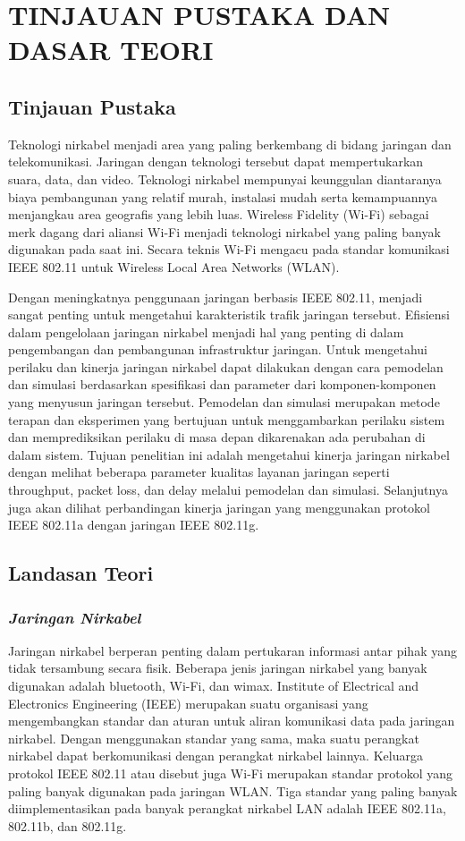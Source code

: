 \documentclass{jtetiproposalskripsi}
\begin{document}
\chapter{TINJAUAN PUSTAKA DAN DASAR TEORI}                

\section{Tinjauan Pustaka}
Teknologi nirkabel menjadi area yang paling berkembang di bidang jaringan dan telekomunikasi. Jaringan dengan teknologi tersebut dapat mempertukarkan suara, data, dan video. Teknologi nirkabel mempunyai keunggulan diantaranya biaya pembangunan yang relatif murah, instalasi mudah serta kemampuannya menjangkau area geografis yang lebih luas. 
Wireless Fidelity (Wi-Fi) sebagai merk dagang dari aliansi Wi-Fi menjadi teknologi nirkabel yang paling banyak digunakan pada saat ini. Secara teknis Wi-Fi mengacu pada standar komunikasi IEEE 802.11 untuk Wireless Local Area Networks (WLAN). 

Dengan meningkatnya penggunaan jaringan berbasis IEEE 802.11, menjadi sangat penting untuk mengetahui karakteristik trafik jaringan tersebut. Efisiensi dalam pengelolaan jaringan nirkabel menjadi hal yang penting di dalam pengembangan dan pembangunan infrastruktur jaringan. Untuk mengetahui perilaku dan kinerja jaringan nirkabel dapat dilakukan dengan cara pemodelan dan simulasi berdasarkan spesifikasi dan parameter dari komponen-komponen yang menyusun jaringan tersebut. Pemodelan dan simulasi merupakan metode terapan dan eksperimen yang bertujuan untuk menggambarkan perilaku sistem dan memprediksikan perilaku di masa depan dikarenakan ada perubahan di dalam sistem. Tujuan penelitian ini adalah mengetahui kinerja jaringan nirkabel dengan melihat beberapa parameter kualitas layanan jaringan seperti throughput, packet loss, dan delay melalui pemodelan dan simulasi. Selanjutnya juga akan dilihat perbandingan kinerja jaringan yang menggunakan protokol IEEE 802.11a dengan jaringan IEEE 802.11g.

\section{Landasan Teori}
\subsection{\emph{Jaringan Nirkabel}}
Jaringan nirkabel berperan penting dalam pertukaran informasi antar pihak yang tidak tersambung secara fisik. Beberapa jenis jaringan nirkabel yang banyak digunakan adalah bluetooth, Wi-Fi, dan wimax. Institute of Electrical and Electronics Engineering (IEEE) merupakan suatu organisasi yang mengembangkan standar dan aturan untuk aliran komunikasi data pada jaringan nirkabel. Dengan menggunakan standar yang sama, maka suatu perangkat nirkabel dapat berkomunikasi dengan perangkat nirkabel lainnya. Keluarga protokol IEEE 802.11 atau disebut juga Wi-Fi merupakan standar protokol yang paling banyak digunakan pada jaringan WLAN. Tiga standar yang paling banyak diimplementasikan pada banyak perangkat nirkabel LAN adalah IEEE 802.11a, 802.11b, dan 802.11g.
\end{document}
